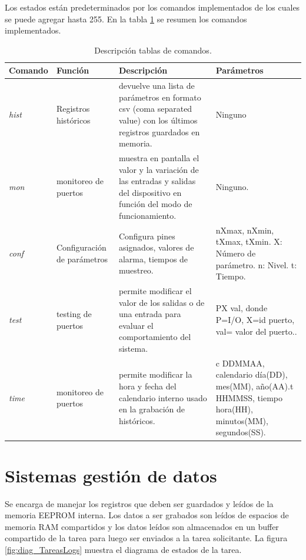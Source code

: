 Los estados están predeterminados por los comandos implementados de los cuales se puede agregar hasta 255. En la tabla \ref{tablas_comandos} se resumen los comandos implementados.

\begin{table}[h!]
\begin{flushleft}
\begin{tabular}{|m{1.5cm}|m{3cm}|m{4.2cm}|m{4.2cm}|}\hline
{\textbf{Comando}} & {\textbf{Función}} & {\textbf{Descripción}} & {\textbf{Parámetros}} \\ \hline
{\textit{hist}} & {Registros históricos} & { devuelve una lista de parámetros en formato csv (coma separated value) con los últimos registros guardados en memoria.} & {Ninguno} \\ \hline
{\textit{mon}} & {monitoreo de puertos} & {muestra en pantalla el valor y la variación de las entradas y salidas del dispositivo en función del modo de funcionamiento.} & {Ninguno.} \\ \hline
{\textit{conf}} & {Configuración de parámetros} & {Configura pines asignados, valores de alarma, tiempos de muestreo.} & {nXmax, nXmin, tXmax, tXmin. X: Número de parámetro. n: Nivel. t: Tiempo.} \\ \hline
{\textit{test}} & {testing de puertos} & {permite modificar el valor de los salidas o de una entrada para evaluar el comportamiento del sistema.} & {PX val, donde P=I/O, X=id puerto, val= valor del puerto..} \\ \hline
{\textit{time}} & {monitoreo de puertos} & {permite modificar la hora y fecha del calendario interno usado en la grabación de históricos.} & {c DDMMAA, calendario día(DD), mes(MM), año(AA).t HHMMSS, tiempo hora(HH), minutos(MM), segundos(SS).} \\ \hline
\end{tabular}
\end{flushleft}
\caption{Descripción tablas de comandos.}
\label{tablas_comandos}
\end{table}


\section{ Sistemas gestión de datos }

Se encarga de manejar los registros que deben ser guardados y leídos de la memoria EEPROM interna. Los datos a ser grabados son leídos de espacios de memoria RAM compartidos y los datos leídos son almacenados en un buffer compartido de la tarea para luego ser enviados a la tarea solicitante.
La figura \ref{fig:diag_TareasLogs} muestra el diagrama de estados de la tarea.

